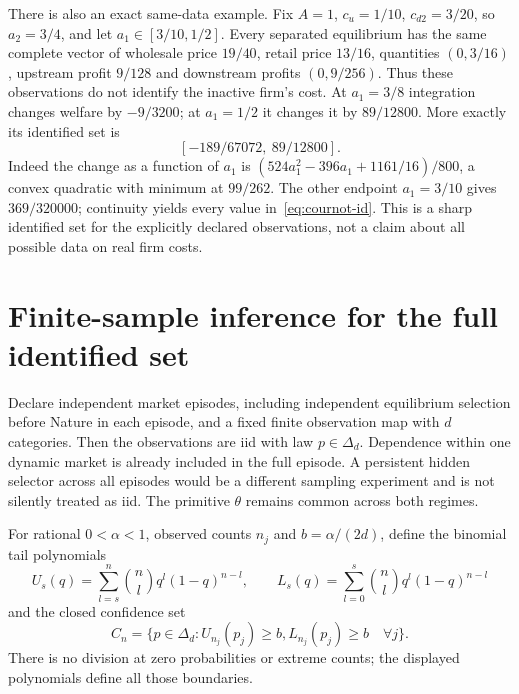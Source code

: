 \documentclass[11pt,a4paper]{article}
\numberwithin{equation}{section}
\theoremstyle{definition}
\begin{document}
There is also an exact same-data example. Fix $A=1$, $c_u=1/10$,
$c_{d2}=3/20$, so $a_2=3/4$, and let $a_1\in[3/10,1/2]$.
Every separated equilibrium has the same complete vector of wholesale
price $19/40$, retail price $13/16$, quantities $(0,3/16)$,
upstream profit $9/128$ and downstream profits $(0,9/256)$.
Thus these observations do not identify the inactive firm's cost.
At $a_1=3/8$ integration changes welfare by $-9/3200$; at $a_1=1/2$
it changes it by $89/12800$. More exactly its identified set is
\begin{equation}\label{eq:cournot-id}
 [-189/67072,\ 89/12800].
\end{equation}
Indeed the change as a function of $a_1$ is
$(524a_1^2-396a_1+1161/16)/800$, a convex quadratic with minimum
at $99/262$. The other endpoint $a_1=3/10$ gives $369/320000$;
continuity yields every value in~\eqref{eq:cournot-id}. This is a
sharp identified set for the explicitly declared observations, not a
claim about all possible data on real firm costs.

\section{Finite-sample inference for the full identified set}\label{sec:inference}

Declare independent market episodes, including independent equilibrium
selection before Nature in each episode, and a fixed finite observation
map with $d$ categories. Then the observations are iid with law
$p\in\Delta_d$. Dependence within one dynamic market is already included
in the full episode. A persistent hidden selector across all episodes
would be a different sampling experiment and is not silently treated
as iid. The primitive $\theta$ remains common across both regimes.

For rational $0<\alpha<1$, observed counts $n_j$ and $b=\alpha/(2d)$,
define the binomial tail polynomials
\[
 U_s(q)=\sum_{l=s}^n\binom nl q^l(1-q)^{n-l},\qquad
 L_s(q)=\sum_{l=0}^s\binom nl q^l(1-q)^{n-l}
\]
and the closed confidence set
\begin{equation}\label{eq:p-confidence}
 C_n=\{p\in\Delta_d:U_{n_j}(p_j)\ge b, 
                             L_{n_j}(p_j)\ge b\quad\forall j\}.
\end{equation}
There is no division at zero probabilities or extreme counts; the
displayed polynomials define all those boundaries.
\end{document}
